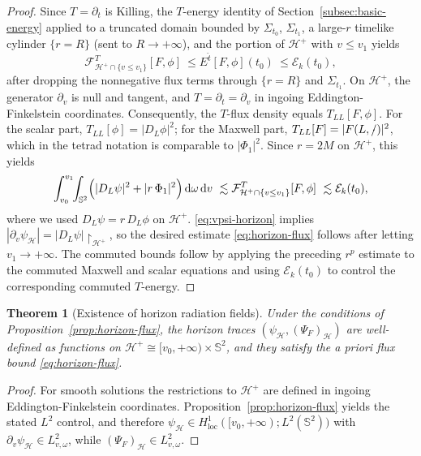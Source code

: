 \documentclass[11pt]{article}
\numberwithin{equation}{section}
\theoremstyle{plain}
\newtheorem{theorem}{Theorem}[section]
\theoremstyle{definition}
\theoremstyle{remark}
\newcommand{\dd}{\mathrm{d}}
\begin{document}
\begin{proof}
Since $T=\partial_t$ is Killing, the $T$-energy identity of Section~\ref{subsec:basic-energy} applied to a truncated domain bounded by $\Sigma_{t_0}$, $\Sigma_{t_1}$, a large-$r$ timelike cylinder $\{r=R\}$ (sent to $R\to+\infty$), and the portion of $\mathcal H^{+}$ with $v\le v_1$ yields
\begin{equation}
\mathcal{F}^{T}_{\mathcal H^{+}\cap\{v\le v_1\}}[F,\phi]
\ \le
E^{\hat t}[F,\phi](t_0)
\ \le
\mathcal{E}_k(t_0),
\end{equation}
after dropping the nonnegative flux terms through $\{r=R\}$ and $\Sigma_{t_1}$.
On $\mathcal H^{+}$, the generator $\partial_v$ is null and tangent, and $T=\partial_t=\partial_v$ in ingoing Eddington-Finkelstein coordinates.
Consequently, the $T$-flux density equals $T_{LL}[F,\phi]$.
For the scalar part, $T_{LL}[\phi]=|D_L\phi|^2$; for the Maxwell part, $T_{LL}[F]=|F(L,\slashed{\cdot})|^2$, which in the tetrad notation is comparable to $|\Phi_1|^2$.
Since $r=2M$ on $\mathcal H^{+}$, this yields
\begin{equation}
\int_{v_0}^{v_1}\!\!\int_{\mathbb S^{2}}
\Bigl(|D_L\psi|^{2}+|r\,\Phi_1|^{2}\Bigr)\,\dd\omega\,\dd v
\ \lesssim
\mathcal{F}^{T}_{\mathcal H^{+}\cap\{v\le v_1\}}[F,\phi]
\ \lesssim
\mathcal{E}_k(t_0),
\end{equation}
where we used $D_L\psi=r\,D_L\phi$ on $\mathcal H^{+}$.
\eqref{eq:vpsi-horizon} implies $|\partial_v\psi_{\mathcal H}|=|D_L\psi|\!\restriction_{\mathcal H^+}$, so the desired estimate \eqref{eq:horizon-flux} follows after letting $v_1\to+\infty$.
The commuted bounds follow by applying the preceding $r^p$ estimate to the commuted Maxwell and scalar equations and using $\mathcal{E}_k(t_0)$ to control the corresponding commuted $T$-energy.
\end{proof}

\begin{theorem}[Existence of horizon radiation fields]\label{thm:horizon-fields}
Under the conditions of Proposition~\ref{prop:horizon-flux}, the horizon traces $(\psi_{\mathcal H},(\Psi_F)_{\mathcal H})$ are well-defined as functions on $\mathcal H^{+}\cong [v_0,+\infty)\times\mathbb S^{2}$, and they satisfy the a priori flux bound \eqref{eq:horizon-flux}.
\end{theorem}

\begin{proof}
For smooth solutions the restrictions to $\mathcal H^{+}$ are defined in ingoing Eddington-Finkelstein coordinates.
Proposition~\ref{prop:horizon-flux} yields the stated $L^{2}$ control, and therefore $\psi_{\mathcal H}\in H^{1}_{\mathrm{loc}}([v_0,+\infty);L^{2}(\mathbb S^{2}))$ with $\partial_v\psi_{\mathcal H}\in L^{2}_{v,\omega}$, while $(\Psi_F)_{\mathcal H}\in L^{2}_{v,\omega}$.
\end{proof}
\end{document}
